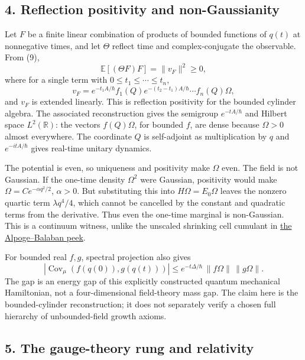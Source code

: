 \documentclass[11pt,a4paper]{article}
\begin{document}
\hypertarget{reflection-positivity-and-non-gaussianity}{%
\subsection{4. Reflection positivity and
non-Gaussianity}\label{reflection-positivity-and-non-gaussianity}}

Let \(F\) be a finite linear combination of products of bounded
functions of \(q(t)\) at nonnegative times, and let \(\Theta\) reflect
time and complex-conjugate the observable. From (9),
\[\mathbb E[(\Theta F)F]=\|v_F\|^2\ge0,\tag{10}\] where for a single
term with \(0\le t_1\le\cdots\le t_n\),
\[v_F=e^{-t_1A/\hbar}f_1(Q)e^{-(t_2-t_1)A/\hbar}
       \cdots f_n(Q)\Omega,\] and \(v_F\) is extended linearly. This is
reflection positivity for the bounded cylinder algebra. The associated
reconstruction gives the semigroup \(e^{-tA/\hbar}\) and Hilbert space
\(L^2(\mathbb R)\): the vectors \(f(Q)\Omega\), for bounded \(f\), are
dense because \(\Omega>0\) almost everywhere. The coordinate \(Q\) is
self-adjoint as multiplication by \(q\) and \(e^{-itA/\hbar}\) gives
real-time unitary dynamics.

The potential is even, so uniqueness and positivity make \(\Omega\)
even. The field is not Gaussian. If the one-time density \(\Omega^2\)
were Gaussian, positivity would make \(\Omega=C e^{-\alpha q^2/2}\),
\(\alpha>0\). But substituting this into \(H\Omega=E_0\Omega\) leaves
the nonzero quartic term \(\lambda q^4/4\), which cannot be cancelled by
the constant and quadratic terms from the derivative. Thus even the
one-time marginal is non-Gaussian. This is a continuum witness, unlike
the unscaled shrinking cell cumulant in
\href{alpoge-balaban-newton-peek.md}{the Alpoge--Balaban peek}.

For bounded real \(f,g\), spectral projection also gives
\[|\operatorname{Cov}_\mu(f(q(0)),g(q(t)))|
\le e^{-t\Delta/\hbar}\,\|f\Omega\|\,\|g\Omega\|.\tag{11}\] The gap is
an energy gap of this explicitly constructed quantum mechanical
Hamiltonian, not a four-dimensional field-theory mass gap. The claim
here is the bounded-cylinder reconstruction; it does not separately
verify a chosen full hierarchy of unbounded-field growth axioms.

\hypertarget{the-gauge-theory-rung-and-relativity}{%
\subsection{5. The gauge-theory rung and
relativity}\label{the-gauge-theory-rung-and-relativity}}
\end{document}
